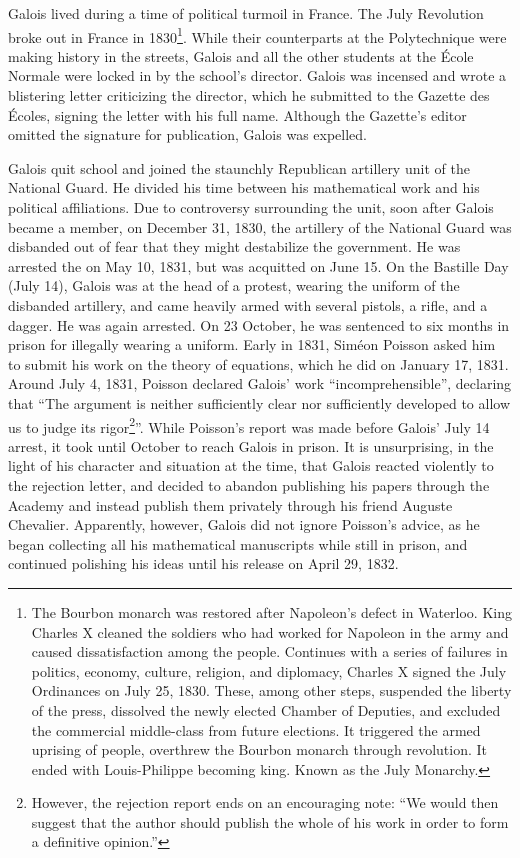 \documentclass{article}
\begin{document}
Galois lived during a time of political turmoil in France. The July Revolution broke out in France in 1830\footnote{The Bourbon monarch was restored after Napoleon's defect in Waterloo. King Charles X cleaned the soldiers who had worked for Napoleon in the army and caused dissatisfaction among the people. Continues with a series of failures in politics, economy, culture, religion, and diplomacy, Charles X signed the July Ordinances on July 25, 1830. These, among other steps, suspended the liberty of the press, dissolved the newly elected Chamber of Deputies, and excluded the commercial middle-class from future elections. It triggered the armed uprising of people, overthrew the Bourbon monarch through revolution. It ended with Louis-Philippe becoming king. Known as the July Monarchy.}. While their counterparts at the Polytechnique were making history in the streets, Galois and all the other students at the École Normale were locked in by the school's director. Galois was incensed and wrote a blistering letter criticizing the director, which he submitted to the Gazette des Écoles, signing the letter with his full name. Although the Gazette's editor omitted the signature for publication, Galois was expelled.

Galois quit school and joined the staunchly Republican artillery unit of the National Guard. He divided his time between his mathematical work and his political affiliations. Due to controversy surrounding the unit, soon after Galois became a member, on December 31, 1830, the artillery of the National Guard was disbanded out of fear that they might destabilize the government. He was arrested the on May 10, 1831, but was acquitted on June 15. On the Bastille Day (July 14), Galois was at the head of a protest, wearing the uniform of the disbanded artillery, and came heavily armed with several pistols, a rifle, and a dagger. He was again arrested. On 23 October, he was sentenced to six months in prison for illegally wearing a uniform. Early in 1831, Siméon Poisson asked him to submit his work on the theory of equations, which he did on January 17, 1831. Around July 4, 1831, Poisson declared Galois' work ``incomprehensible'', declaring that ``The argument is neither sufficiently clear nor sufficiently developed to allow us to judge its rigor\footnote{However, the rejection report ends on an encouraging note: ``We would then suggest that the author should publish the whole of his work in order to form a definitive opinion.''\cite{Wiki-Galois}}''. While Poisson's report was made before Galois' July 14 arrest, it took until October to reach Galois in prison. It is unsurprising, in the light of his character and situation at the time, that Galois reacted violently to the rejection letter, and decided to abandon publishing his papers through the Academy and instead publish them privately through his friend Auguste Chevalier. Apparently, however, Galois did not ignore Poisson's advice, as he began collecting all his mathematical manuscripts while still in prison, and continued polishing his ideas until his release on April 29, 1832.
\end{document}
